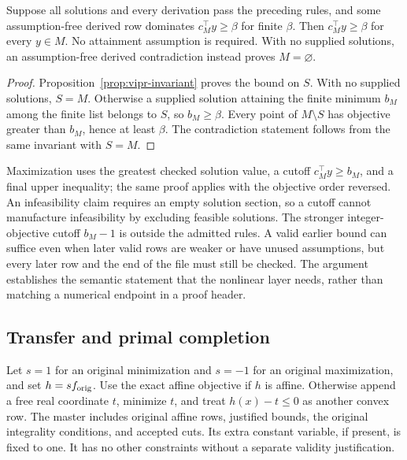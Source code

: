 \begin{theorem}
\label{thm:master-bound}
Suppose all solutions and every derivation pass the preceding rules, and some assumption-free derived row dominates $c_M^\top y\geq\beta$ for finite $\beta$. Then $c_M^\top y\geq\beta$ for every $y\in M$. No attainment assumption is required. With no supplied solutions, an assumption-free derived contradiction instead proves $M=\varnothing$.
\end{theorem}
\begin{proof}
Proposition~\ref{prop:vipr-invariant} proves the bound on $S$. With no supplied solutions, $S=M$. Otherwise a supplied solution attaining the finite minimum $b_M$ among the finite list belongs to $S$, so $b_M\geq\beta$. Every point of $M\setminus S$ has objective greater than $b_M$, hence at least $\beta$. The contradiction statement follows from the same invariant with $S=M$.
\end{proof}
Maximization uses the greatest checked solution value, a cutoff $c_M^\top y\geq b_M$, and a final upper inequality; the same proof applies with the objective order reversed. An infeasibility claim requires an empty solution section, so a cutoff cannot manufacture infeasibility by excluding feasible solutions. The stronger integer-objective cutoff $b_M-1$ is outside the admitted rules. A valid earlier bound can suffice even when later valid rows are weaker or have unused assumptions, but every later row and the end of the file must still be checked. The argument establishes the semantic statement that the nonlinear layer needs, rather than matching a numerical endpoint in a proof header.

\subsection{Transfer and primal completion}
\label{sec:bound-transfer}
Let $s=1$ for an original minimization and $s=-1$ for an original maximization, and set $h=s f_{\rm orig}$. Use the exact affine objective if $h$ is affine. Otherwise append a free real coordinate $t$, minimize $t$, and treat $h(x)-t\leq0$ as another convex row. The master includes original affine rows, justified bounds, the original integrality conditions, and accepted cuts. Its extra constant variable, if present, is fixed to one. It has no other constraints without a separate validity justification.

